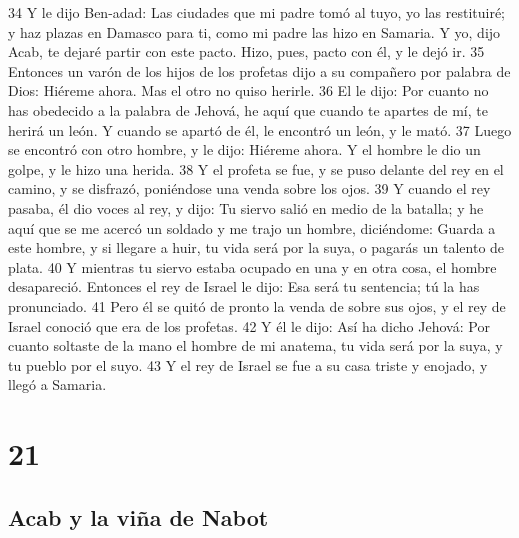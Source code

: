 34 Y le dijo Ben-adad: Las ciudades que mi padre tomó al tuyo, yo las restituiré; y haz plazas en Damasco para ti, como mi padre las hizo en Samaria. Y yo, dijo Acab, te dejaré partir con este pacto. Hizo, pues, pacto con él, y le dejó ir.
35 Entonces un varón de los hijos de los profetas dijo a su compañero por palabra de Dios: Hiéreme ahora. Mas el otro no quiso herirle.
36 El le dijo: Por cuanto no has obedecido a la palabra de Jehová, he aquí que cuando te apartes de mí, te herirá un león. Y cuando se apartó de él, le encontró un león, y le mató.
37 Luego se encontró con otro hombre, y le dijo: Hiéreme ahora. Y el hombre le dio un golpe, y le hizo una herida.
38 Y el profeta se fue, y se puso delante del rey en el camino, y se disfrazó, poniéndose una venda sobre los ojos.
39 Y cuando el rey pasaba, él dio voces al rey, y dijo: Tu siervo salió en medio de la batalla; y he aquí que se me acercó un soldado y me trajo un hombre, diciéndome: Guarda a este hombre, y si llegare a huir, tu vida será por la suya, o pagarás un talento de plata.
40 Y mientras tu siervo estaba ocupado en una y en otra cosa, el hombre desapareció. Entonces el rey de Israel le dijo: Esa será tu sentencia; tú la has pronunciado.
41 Pero él se quitó de pronto la venda de sobre sus ojos, y el rey de Israel conoció que era de los profetas.
42 Y él le dijo: Así ha dicho Jehová: Por cuanto soltaste de la mano el hombre de mi anatema, tu vida será por la suya, y tu pueblo por el suyo.
43 Y el rey de Israel se fue a su casa triste y enojado, y llegó a Samaria.

\chapter{21}

\section*{Acab y la viña de Nabot}

